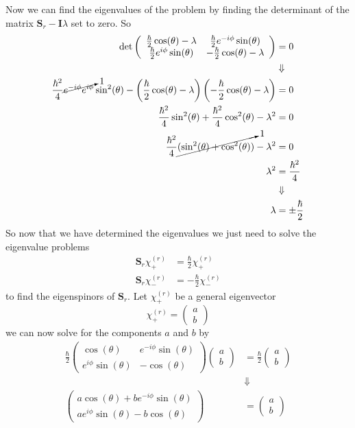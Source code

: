 \documentclass[11pt]{article}
\numberwithin{equation}{section}
\begin{document}
Now we can find the eigenvalues of the problem by finding the determinant of the matrix $\mathbf{S}_r-\mathbf{I}\lambda$ set to zero. So
\begin{align*}
\det\left(\begin{array}{cc}
 \frac{\hbar}{2}\cos(\theta)-\lambda    &\frac{\hbar}{2}e^{-i\phi}\sin(\theta)\\
 \frac{\hbar}{2}e^{i\phi}\sin(\theta) &-\frac{\hbar}{2}\cos(\theta)-\lambda
                         \end{array}\right) &= 0\\
&\Downarrow\\
\frac{\hbar^2}{4}\cancelto{1}{e^{-i\phi}e^{i\phi}}\sin^2(\theta) - \left(\frac{\hbar}{2}\cos(\theta)-\lambda\right)\left(-\frac{\hbar}{2}\cos(\theta)-\lambda\right)&=0\\
\frac{\hbar^2}{4}\sin^2(\theta) + \frac{\hbar^2}{4}\cos^2(\theta)-\lambda^2 &= 0\\
\frac{\hbar^2}{4}\cancelto{1}{(\sin^2(\theta) + \cos^2(\theta))}-\lambda^2 &= 0\\
\lambda^2 &= \frac{\hbar^2}{4}\\
&\Downarrow\\
\lambda &= \pm\frac{\hbar}{2}
\end{align*}
So now that we have determined the eigenvalues we just need to solve the eigenvalue problems
\begin{align}
\mathbf{S}_r\chi^{(r)}_+ &= \frac{\hbar}{2}\chi^{(r)}_+\\
\mathbf{S}_r\chi^{(r)}_- &= -\frac{\hbar}{2}\chi^{(r)}_-
\end{align}
to find the eigenspinors of $\mathbf{S}_r$. Let $\chi^{(r)}_+$ be a general eigenvector
$$\chi^{(r)}_+ = \left(\begin{array}{c}a\\ b\end{array}\right)$$
we can now solve for the components $a$ and $b$ by
\begin{align*}
\frac{\hbar}{2}\left(\begin{array}{cc}
       \cos(\theta)    &e^{-i\phi}\sin(\theta)\\
       e^{i\phi}\sin(\theta) &-\cos(\theta)
      \end{array}\right)\left(\begin{array}{c}a\\ b\end{array}\right) &= \frac{\hbar}{2}\left(\begin{array}{c}a\\ b\end{array}\right)\\
&\Downarrow\\
\left(\begin{array}{c}
       a\cos(\theta) + be^{-i\phi}\sin(\theta)\\
       ae^{i\phi}\sin(\theta) - b\cos(\theta)\end{array}\right)
      &= \left(\begin{array}{c}a\\ b\end{array}\right)
\end{align*}
\end{document}
